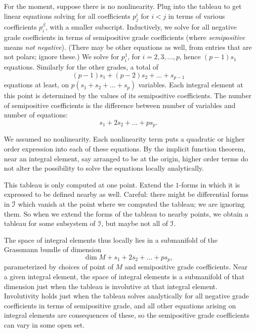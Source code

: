 For the moment, suppose there is no nonlinearity.
Plug into the tableau to get linear equations solving for all coefficients \(p^i_j\) for \(i<j\) in terms of various coefficients \(p^{\beta}_i\), with a smaller subscript.
Inductively, we solve for all negative grade coefficients in terms of semipositive grade coefficients (where \emph{semipositive} means \emph{not negative}). 
(There may be other equations as well, from entries that are not polars; ignore these.)
We solve for \(p^1_i\), for \(i=2,3,\dots,p\), hence \((p-1)s_1\) equations.
Similarly for the other grades, a total of
\[
(p-1)s_1+(p-2)s_2+\dots+s_{p-1}
\]
equations at least, on \(p(s_1+s_2+\dots+s_p)\) variables.
Each integral element at this point is determined by the values of its semipositive coefficients.
The number of semipositive coefficients is the difference between number of variables and number of equations:
\[
s_1+2s_2+\dots+ps_p.
\]

We assumed no nonlinearity.
Each nonlinearity term puts a quadratic or higher order expression into each of these equations.
By the implicit function theorem, near an integral element, say arranged to be at the origin, higher order terms do not alter the possibility to solve the equations locally analytically.

This tableau is only computed at one point.
Extend the \(1\)-forms in which it is expressed to be defined nearby as well.
Careful: there might be differential forms in \(\mathcal{I}\) which vanish at the point where we computed the tableau; we are ignoring them.
So when we extend the forms of the tableau to nearby points, we obtain a tableau for some subsystem of \(\mathcal{I}\), but maybe not all of \(\mathcal{I}\).

The space of integral elements thus locally lies in a submanifold of the Grassmann bundle of dimension
\[
\dim M + s_1+2s_2+\dots+ps_p,
\]
parameterized by choices of point of \(M\) and semipositive grade coefficients.
Near a given integral element, the space of integral elements is a submanifold of that dimension just when the tableau is involutive at that integral element.
Involutivity holds just when the tableau solves analytically for all negative grade coefficients in terms of semipositive grade, and all other equations arising on integral elements are consequences of these, so the semipositive grade coefficients can vary in some open set.

